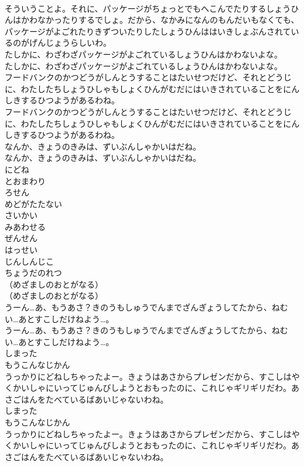 \documentclass[8pt]{extreport}
\begin{document}
\begin{CJK}{UTF8}{min}
\\	そういうことよ。それに、パッケージがちょっとでもへこんでたりするしょうひんはかわなかったりするでしょ。だから、なかみになんのもんだいもなくても、パッケージがよごれたりきずついたりしたしょうひんははいきしょぶんされているのがげんじょうらしいわ。
\\	たしかに、わざわざパッケージがよごれているしょうひんはかわないよな。
\\	たしかに、わざわざパッケージがよごれているしょうひんはかわないよな。
\\	フードバンクのかつどうがしんとうすることはたいせつだけど、それとどうじに、わたしたちしょうひしゃもしょくひんがむだにはいきされていることをにんしきするひつようがあるわね。
\\	フードバンクのかつどうがしんとうすることはたいせつだけど、それとどうじに、わたしたちしょうひしゃもしょくひんがむだにはいきされていることをにんしきするひつようがあるわね。
\\	なんか、きょうのきみは、ずいぶんしゃかいはだね。
\\	なんか、きょうのきみは、ずいぶんしゃかいはだね。
\\	にどね
\\	とおまわり
\\	ろせん
\\	めどがたたない
\\	さいかい
\\	みあわせる
\\	ぜんせん
\\	はっせい
\\	じんしんじこ
\\	ちょうだのれつ
\\	（めざましのおとがなる）
\\	（めざましのおとがなる）
\\	うーん…あ、もうあさ？きのうもしゅうでんまでざんぎょうしてたから、ねむい…あとすこしだけねよう…。
\\	うーん…あ、もうあさ？きのうもしゅうでんまでざんぎょうしてたから、ねむい…あとすこしだけねよう…。
\\	しまった
\\	もうこんなじかん
\\	うっかりにどねしちゃったよー。きょうはあさからプレゼンだから、すこしはやくかいしゃにいってじゅんびしようとおもったのに、これじゃギリギリだわ。あさごはんをたべているばあいじゃないわね。
\\	しまった
\\	もうこんなじかん
\\	うっかりにどねしちゃったよー。きょうはあさからプレゼンだから、すこしはやくかいしゃにいってじゅんびしようとおもったのに、これじゃギリギリだわ。あさごはんをたべているばあいじゃないわね。

\end{CJK}
\end{document}
